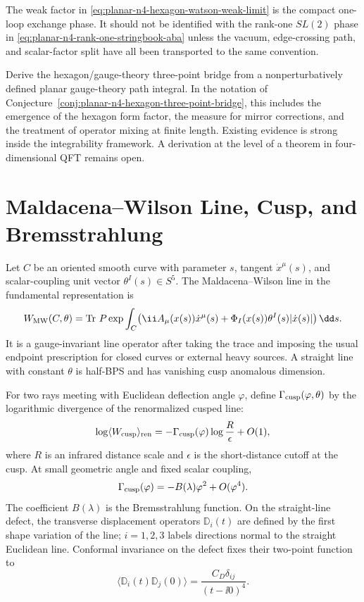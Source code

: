 The weak factor in
\eqref{eq:planar-n4-hexagon-watson-weak-limit} is the compact one-loop
exchange phase.  It should not be identified with the rank-one \(SL(2)\)
phase in \eqref{eq:planar-n4-rank-one-stringbook-aba} unless the vacuum,
edge-crossing path, and scalar-factor split have all been transported to the
same convention.

\begin{openproblem}
\label{op:planar-n4-hexagon-derivation}
Derive the hexagon/gauge-theory three-point bridge from a nonperturbatively
defined planar gauge-theory path integral.  In the notation of
Conjecture~\ref{conj:planar-n4-hexagon-three-point-bridge}, this includes the
emergence of the hexagon form factor, the measure for mirror corrections, and
the treatment of operator mixing at finite length.  Existing evidence is
strong inside the integrability framework.  A derivation at the level of a
theorem in four-dimensional QFT remains open.
\end{openproblem}

\section{Maldacena--Wilson Line, Cusp, and Bremsstrahlung}

Let \(C\) be an oriented smooth curve with parameter \(s\), tangent
\(\dot x^\mu(s)\), and scalar-coupling unit vector
\(\theta^I(s)\in S^5\).  The Maldacena--Wilson line in the fundamental
representation is
\[
  W_{\rm MW}(C,\theta)
  =
  \operatorname{Tr}\,P\exp\int_C
  \bigl(\ii A_\mu(x(s))\dot x^\mu(s)
  +\Phi_I(x(s))\theta^I(s)|\dot x(s)|\bigr)\,\dd s .
\]
It is a gauge-invariant line operator after taking the trace and imposing the
usual endpoint prescription for closed curves or external heavy sources.  A
straight line with constant \(\theta\) is half-BPS and has vanishing cusp
anomalous dimension.

For two rays meeting with Euclidean deflection angle \(\varphi\), define
\(\Gamma_{\rm cusp}(\varphi,\theta)\) by the logarithmic divergence of the
renormalized cusped line:
\[
  \log\langle W_{\rm cusp}\rangle_{\rm ren}
  =
  -\Gamma_{\rm cusp}(\varphi)\log\frac{R}{\epsilon}+O(1),
\]
where \(R\) is an infrared distance scale and \(\epsilon\) is the short-distance
cutoff at the cusp.  At small geometric angle and fixed scalar coupling,
\[
  \Gamma_{\rm cusp}(\varphi)
  =
  -B(\lambda)\varphi^2+O(\varphi^4).
\]
The coefficient \(B(\lambda)\) is the Bremsstrahlung function.  On the
straight-line defect, the transverse displacement operators \(\mathbb D_i(t)\)
are defined by the first shape variation of the line; \(i=1,2,3\) labels
directions normal to the straight Euclidean line.  Conformal invariance on the
defect fixes their two-point function to
\[
  \langle \mathbb D_i(t)\mathbb D_j(0)\rangle
  =
  \frac{C_D\delta_{ij}}{(t-\ii0)^4}.
\]

